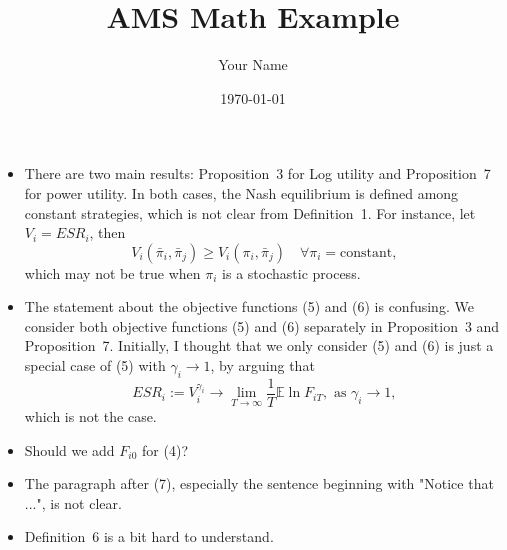 \documentclass{article}
\begin{document}
\title{AMS Math Example}
\author{Your Name}
\date{\today}


\begin{itemize}
    \item There are two main results: Proposition~3 for Log utility and Proposition~7 for power utility. In both cases, the Nash equilibrium is defined among constant strategies, which is not clear from Definition~1. For instance, let $V_i = ESR_i$, then 
    $$ V_i (\bar \pi_i, \bar \pi_j) \ge V_i(\pi_i, \bar \pi_j) \quad \forall \pi_i = \text{constant},$$ 
    which may not be true when $\pi_i$ is a stochastic process.
    \item The statement about the objective functions 
    (5) and (6) is confusing. 
    We consider both objective functions (5) and (6) separately in Proposition~3 and Proposition~7. 
    Initially, I thought that we only consider (5) and 
    (6) is just a special case of (5) with $\gamma_i \to 1$, by arguing that
    $$ESR_i := V_i^{\gamma_i} \to \lim_{T\to \infty} \frac{1}{T} \mathbb{E} \ln F_{iT},
    \text{ as } \gamma_i \to 1,$$
    which is not the case.
    \item Should we add $F_{i0}$ for (4)?
    \item The paragraph after (7), especially the sentence beginning with "Notice that ...", is not clear. 
    \item Definition~6 is a bit hard to understand.
\end{itemize}
\end{document}
